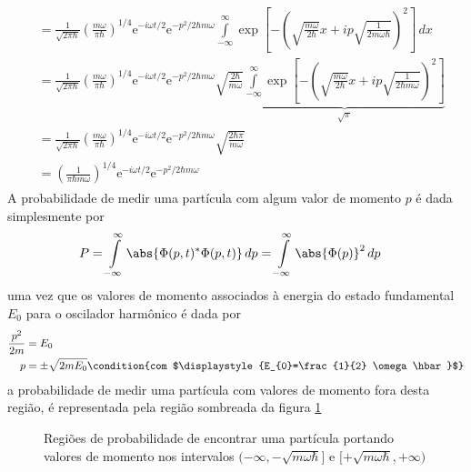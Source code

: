 \begin{prob}
\begin{sol}
\begin{align}
\begin{split}
												&= \frac{1}{\sqrt{2 \pi \hbar}}\left(\frac{m \omega}{\pi \hbar}\right)^{1/4}\mathrm{e}^{-i \omega t/2}\mathrm{e}^{-p^{2}/2\hbar m \omega}\int\limits_{-\infty}^{\infty}\exp \left[-\left(\sqrt{\frac{m \omega}{2 \hbar}}x+ip\sqrt{\frac{1}{2m \omega \hbar}}\right)^{2}\right]\,d{x}\\
												&= \frac{1}{\sqrt{2 \pi \hbar}}\left(\frac{m \omega}{\pi \hbar}\right)^{1/4}\mathrm{e}^{-i \omega t/2}\mathrm{e}^{-p^{2}/2\hbar m \omega}\sqrt{\frac{2\hbar}{m \omega}}\underbrace{\int\limits_{-\infty}^{\infty}\exp\left[-\left(\sqrt{\frac{m \omega}{2\hbar}}x+ip\sqrt{\frac{1}{2\hbar m \omega}}\right)^{2}\right]}_{\displaystyle{\sqrt{\pi}}}\\
												&= \frac{1}{\sqrt{2 \pi \hbar}}\left(\frac{m \omega}{\pi \hbar}\right)^{1/4}\mathrm{e}^{-i \omega t /2}\mathrm{e}^{-p^{2}/2\hbar m \omega}\sqrt{\frac{2\hbar \pi}{m \omega}}\\
												&= \left(\frac{1}{\pi \hbar m \omega}\right)^{1/4}\mathrm{e}^{-i \omega t/2}\mathrm{e}^{-p^{2}/2\hbar m \omega}
						\end{split}
				\end{align}
				A probabilidade de medir uma partícula com algum valor de momento $p$ é dada simplesmente por
				\begin{align}
					P&=\int\limits_{-\infty}^{\infty}\abs{\Phi(p,t)^{*} \Phi(p,t)}\,d{p}=\int\limits_{-\infty}^{\infty}\abs{\Phi(p)}^{2}\,d{p}
				\end{align}
				uma vez que os valores de momento associados à energia do estado fundamental $E_{0}$ para o oscilador harmônico é dada por
				\begin{align}
					\frac{p^{2}}{2m} &= E_{0}\\
					p &= \pm\sqrt{2mE_{0}}\condition{com $\displaystyle{E_{0}=\frac{1}{2} \omega \hbar}$}
				\end{align}
				a probabilidade de medir uma partícula com valores de momento fora desta região, é representada pela região sombreada da figura \ref{fig:pltQ04-l2} 
				\begin{figure}[ht!]
					\centering
					
					\caption{Regiões de probabilidade de encontrar uma partícula portando valores de momento nos intervalos $(-\infty,-\sqrt{m \omega \hbar}$] e $[+\sqrt{m \omega \hbar}, +\infty)$}
					\label{fig:pltQ04-l2}
				\end{figure}


\end{sol}
\end{prob}
